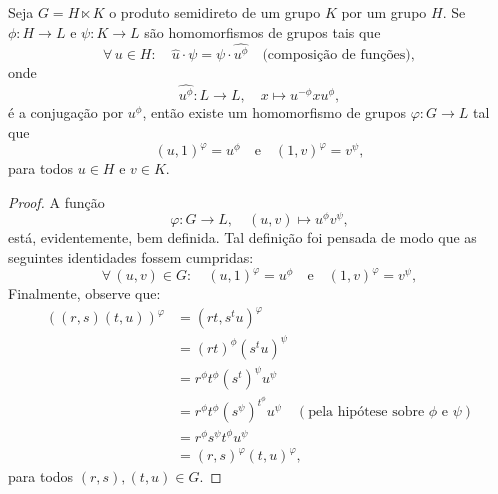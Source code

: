 \begin{proposition}
  Seja $G=H\ltimes{K}$ o produto semidireto de um grupo $K$ por um grupo $H$. Se $\phi:H\to{L}$ e $\psi:K\to{L}$ são homomorfismos de grupos tais que
  \[
    \forall\,u\in{H}:\quad{\widehat{u}\cdot\psi=\psi\cdot\widehat{u^{\phi}}}\quad\text{(composição de funções)},
  \]
  onde
  \[
    \widehat{u^{\phi}}:L\to{L},\quad{x\mapsto{u^{-\phi}xu^{\phi}}},
  \]
  é a conjugação por $u^{\phi}$, então existe um homomorfismo de grupos $\varphi:G\to{L}$ tal que
  \[
    (u,1)^{\varphi}=u^{\phi}
    \quad\text{e}\quad
    (1,v)^{\varphi}=v^{\psi},
  \]
  para todos $u\in{H}$ e $v\in{K}$.
\end{proposition}

\begin{proof}
  A função
  \[
    \varphi:G\to{L},\quad{(u,v)\mapsto{u^{\phi}v^{\psi}}},
  \]
  está, evidentemente, bem definida. Tal definição foi pensada de modo que as seguintes identidades fossem cumpridas:
  \[
    \forall\,(u,v)\in{G}:
    \quad
    (u,1)^{\varphi}=u^{\phi}
    \quad\text{e}\quad
    (1,v)^{\varphi}=v^{\psi},
  \]
  Finalmente, observe que:
  \begin{align*}
    \left((r,s)(t,u)\right)^{\varphi}
    &=(rt,s^{t}u)^{\varphi}                                                                             \\
    &=(rt)^{\phi}(s^{t}u)^{\psi}                                                                        \\
    &=r^{\phi}t^{\phi}(s^{t})^{\psi}u^{\psi}                                                            \\
    &=r^{\phi}t^{\phi}(s^{\psi})^{t^{\phi}}u^{\psi}\quad(\text{pela hipótese sobre }\phi\text{ e }\psi) \\
    &=r^{\phi}s^{\psi}t^{\phi}u^{\psi}                                                                  \\
    &=(r,s)^{\varphi}(t,u)^{\varphi},
  \end{align*}
  para todos $(r,s),(t,u)\in{G}$.
\end{proof}

